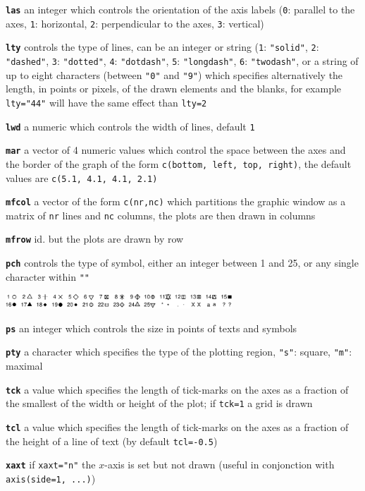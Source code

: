 \documentclass[10pt,landscape]{article}
\newcommand{\code}{\texttt}
\newcommand{\bcode}[1]{\texttt{\textbf{#1}}}
\begin{document}
\begin{multicols}{3}
\bcode{las}  an integer which controls the orientation of the axis labels (\code{0}: parallel to the axes, \code{1}: horizontal, \code{2}: perpendicular to the axes, \code{3}: vertical)

\bcode{lty}  controls the type of lines, can be an integer or string (\code{1}: \code{"solid"}, \code{2}: \code{"dashed"}, \code{3}: \code{"dotted"}, \code{4}: \code{"dotdash"}, \code{5}: \code{"longdash"}, \code{6}: \code{"twodash"}, or a string of up to eight characters (between \code{"0"} and \code{"9"}) which specifies alternatively the length, in points or pixels, of the drawn elements and the blanks, for example \code{lty="44"} will have the same effect than \code{lty=2}

\bcode{lwd}  a numeric which controls the width of lines, default \code{1}

\bcode{mar}  a vector of 4 numeric values which control the space between the axes and the border of the graph of the form \code{c(bottom, left, top, right)}, the default values are \code{c(5.1, 4.1, 4.1, 2.1)}

\bcode{mfcol}  a vector of the form \code{c(nr,nc)} which partitions the graphic window as a matrix of \code{nr} lines and \code{nc} columns, the plots are then drawn in columns

\bcode{mfrow}  id. but the plots are drawn by row

\bcode{pch}  controls the type of symbol, either an integer between 1
and 25, or any single character within \code{""}

\samepage\includegraphics[width=8.5cm]{pch_symbol} 

\bcode{ps}  an integer which controls the size in points of texts and symbols

\bcode{pty}  a character which specifies the type of the plotting region, \code{"s"}: square, \code{"m"}: maximal

\bcode{tck}  a value which specifies the length of tick-marks on the axes as a fraction of the smallest of the width or height of the plot; if \code{tck=1} a grid is drawn

\bcode{tcl}  a value which specifies the length of tick-marks on the axes as a fraction of the height of a line of text (by default \code{tcl=-0.5})

\bcode{xaxt}  if \code{xaxt="n"} the $x$-axis is set but not drawn (useful in conjonction with \code{axis(side=1, ...)})


\end{multicols}
\end{document}
